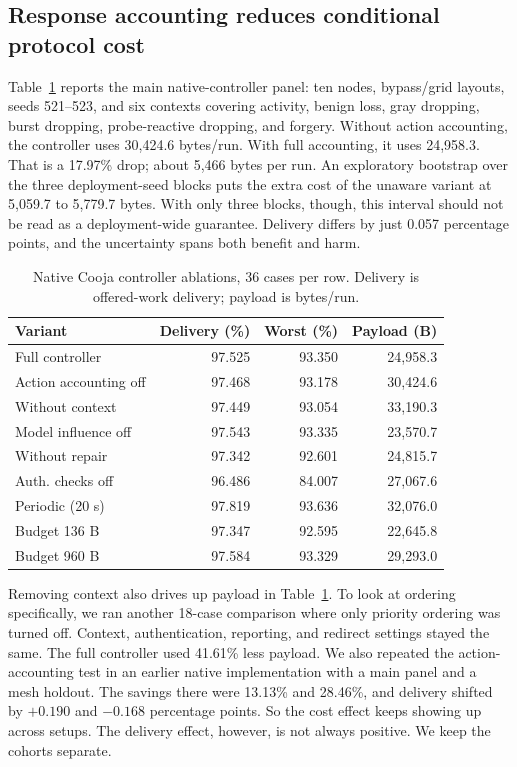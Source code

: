 \documentclass[journal]{IEEEtran}
\begin{document}
\subsection{Response accounting reduces conditional protocol cost}\label{sec:accountresults}
Table~\ref{tab:native} reports the main native-controller panel: ten nodes, bypass/grid layouts, seeds 521--523, and six contexts covering activity, benign loss, gray dropping, burst dropping, probe-reactive dropping, and forgery. Without action accounting, the controller uses 30,424.6 bytes/run. With full accounting, it uses 24,958.3. That is a 17.97\% drop; about 5,466 bytes per run. An exploratory bootstrap over the three deployment-seed blocks puts the extra cost of the unaware variant at 5,059.7 to 5,779.7 bytes. With only three blocks, though, this interval should not be read as a deployment-wide guarantee. Delivery differs by just 0.057 percentage points, and the uncertainty spans both benefit and harm.

\begin{table}[t]
\caption{Native Cooja controller ablations, 36 cases per row. Delivery is offered-work delivery; payload is bytes/run.}
\label{tab:native}\centering\small
\begin{tabular}{lrrr}\toprule
Variant & Delivery (\%) & Worst (\%) & Payload (B)\\\midrule
Full controller &97.525&93.350&24,958.3\\
Action accounting off&97.468&93.178&30,424.6\\
Without context&97.449&93.054&33,190.3\\
Model influence off&97.543&93.335&23,570.7\\
Without repair&97.342&92.601&24,815.7\\
Auth. checks off&96.486&84.007&27,067.6\\
Periodic (20 s)&97.819&93.636&32,076.0\\
Budget 136 B&97.347&92.595&22,645.8\\
Budget 960 B&97.584&93.329&29,293.0\\\bottomrule
\end{tabular}
\end{table}

Removing context also drives up payload in Table~\ref{tab:native}. To look at ordering specifically, we ran another 18-case comparison where only priority ordering was turned off. Context, authentication, reporting, and redirect settings stayed the same. The full controller used 41.61\% less payload. We also repeated the action-accounting test in an earlier native implementation with a main panel and a mesh holdout. The savings there were 13.13\% and 28.46\%, and delivery shifted by $+0.190$ and $-0.168$ percentage points. So the cost effect keeps showing up across setups. The delivery effect, however, is not always positive. We keep the cohorts separate.
\end{document}
